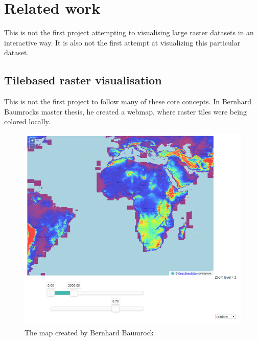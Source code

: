 \chapter{Related work}

This is not the first project attempting to visualising large raster datasets in an interactive way. It is also not the first attempt at visualizing this particular dataset. 


\section{Tilebased raster visualisation}

This is not the first project to follow many of these core concepts. In Bernhard Baumrocks master thesis, he created a webmap, where raster tiles were being colored locally. \citep{Buamrocks}
\begin{figure} [H]
	\centering
	\includegraphics[width=.8\textwidth]{Pictures/BaumrockMap1}
	\caption{The map created by Bernhard Baumrock}
	\label{BaumrockMap1}
\end{figure}

